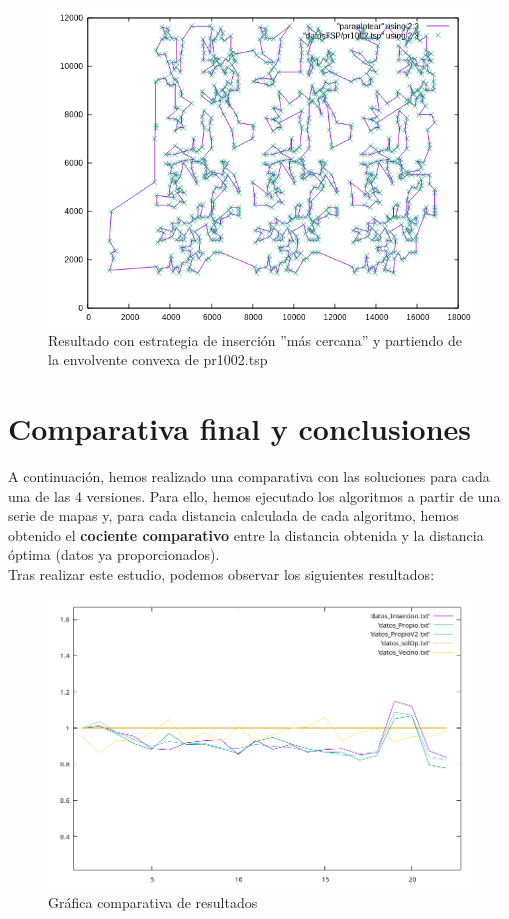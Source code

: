 \documentclass{article}
\begin{document}
\begin{figure}[H]
	\centering
	\includegraphics[totalheight=8cm]{img/convex_second}
	\caption{Resultado con estrategia de inserción ''más cercana'' y partiendo de la envolvente convexa de pr1002.tsp}
	\label{fig:convex_second}
	\end{figure}	


\section{Comparativa final y conclusiones}
A continuación, hemos realizado una comparativa con las soluciones para cada una de las 4 versiones. Para ello, hemos ejecutado los algoritmos a partir de una serie de mapas y, para cada distancia calculada de cada algoritmo, hemos obtenido el \textbf{cociente comparativo} entre la distancia obtenida y la distancia óptima (datos ya proporcionados).\\
Tras realizar este estudio, podemos observar los siguientes resultados:
\begin{figure}[H]
	\centering
	\includegraphics[totalheight=6cm]{img/comparativa}
	\caption{Gráfica comparativa de resultados}
	\label{fig:comparativa}
\end{figure}
\end{document}
